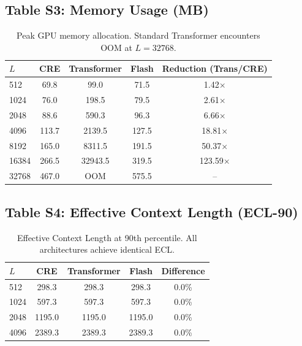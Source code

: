 \subsection*{Table S3: Memory Usage (MB)}
\begin{table}[h]
\centering
\begin{tabular}{lcccc}
\toprule
$L$ & CRE & Transformer & Flash & Reduction (Trans/CRE) \\
\midrule
512 & 69.8 & 99.0 & 71.5 & 1.42$\times$ \\
1024 & 76.0 & 198.5 & 79.5 & 2.61$\times$ \\
2048 & 88.6 & 590.3 & 96.3 & 6.66$\times$ \\
4096 & 113.7 & 2139.5 & 127.5 & 18.81$\times$ \\
8192 & 165.0 & 8311.5 & 191.5 & 50.37$\times$ \\
16384 & 266.5 & 32943.5 & 319.5 & 123.59$\times$ \\
32768 & 467.0 & OOM & 575.5 & -- \\
\bottomrule
\end{tabular}
\caption{Peak GPU memory allocation. Standard Transformer encounters OOM at $L=32768$.}
\end{table}

\subsection*{Table S4: Effective Context Length (ECL-90)}
\begin{table}[h]
\centering
\begin{tabular}{lcccc}
\toprule
$L$ & CRE & Transformer & Flash & Difference \\
\midrule
512 & 298.3 & 298.3 & 298.3 & 0.0\% \\
1024 & 597.3 & 597.3 & 597.3 & 0.0\% \\
2048 & 1195.0 & 1195.0 & 1195.0 & 0.0\% \\
4096 & 2389.3 & 2389.3 & 2389.3 & 0.0\% \\
\bottomrule
\end{tabular}
\caption{Effective Context Length at 90th percentile. All architectures achieve identical ECL.}
\end{table}

